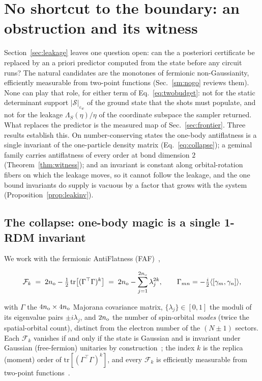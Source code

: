 \section{No shortcut to the boundary: an obstruction and its witness}
\label{sec:nogo}

Section~\ref{sec:leakage} leaves one question open: can the a posteriori certificate be replaced by an
a priori predictor computed from the state before any circuit runs? The natural candidates are the
monotones of fermionic non-Gaussianity, efficiently measurable from two-point functions
(Sec.~\ref{sm:nogo} reviews them). None can play that role, for either term of
Eq.~\eqref{eq:twobudget}: not for the static determinant support $|\mathcal S|_{\varepsilon_w}$ of the
ground state that the shots must populate, and not for the leakage $\Lambda_S(\eta)/\eta$ of the
coordinate subspace the sampler returned. What replaces the predictor is the measured map of
Sec.~\ref{sec:frontier}. Three results establish this. On number-conserving states the one-body
antiflatness is a single invariant of the one-particle density matrix (Eq.~\eqref{eq:collapse}); a
geminal family carries antiflatness of every order at bond dimension $2$ (Theorem~\ref{thm:witness});
and an invariant is constant along orbital-rotation fibers on which the leakage moves, so it cannot
follow the leakage, and the one bound invariants do supply is vacuous by a factor that grows with the
system (Proposition~\ref{prop:leakinv}).

\subsection{The collapse: one-body magic is a single 1-RDM invariant}
\label{sec:nogo:collapse}

We work with the fermionic AntiFlatness (FAF)~\cite{sierant2026},
\begin{widetext}
\begin{equation}
\mathcal F_k \;=\; 2n_{\rm o}-\tfrac12\,\mathrm{tr}\bigl[(\Gamma^{\top}\Gamma)^k\bigr] \;=\; 2n_{\rm o}-\sum_{j=1}^{2n_{\rm o}}\lambda_j^{2k},
\qquad \Gamma_{mn}=-\tfrac{i}{2}\langle[\gamma_m,\gamma_n]\rangle,
\label{eq:faf}
\end{equation}
\end{widetext}
with $\Gamma$ the $4n_{\rm o}\times4n_{\rm o}$ Majorana covariance matrix, $\{\lambda_j\}\in[0,1]$ the
moduli of its eigenvalue pairs $\pm i\lambda_j$, and $2n_{\rm o}$ the number of spin-orbital \emph{modes}
(twice the spatial-orbital count), distinct from the electron number of the $(N\pm1)$ sectors. Each
$\mathcal F_k$ vanishes if and only if the state is Gaussian and is invariant under Gaussian
(free-fermion) unitaries by construction~\cite{sierant2026}; the index $k$ is the replica (moment) order
of $\mathrm{tr}[(\Gamma^{\top}\Gamma)^k]$, and every $\mathcal F_k$ is efficiently measurable from
two-point functions~\cite{sierant2026,bittel2025,tarabunga2026}.


